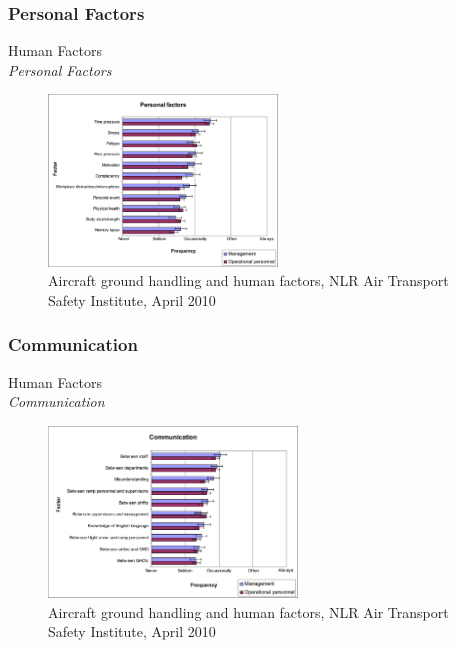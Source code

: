 \subsubsection{Personal Factors}
\begin{frame}{Human Factors\\\small\textit{Personal Factors}}{}
	\begin{figure}[H]
	\centering
	\includegraphics[width=230px]{Grafik/PersonalFactors}
	\caption{\footnotesize Aircraft ground handling and human factors, NLR Air Transport Safety Institute, April 2010}
\end{figure}
\end{frame}

\subsubsection{Communication}
\begin{frame}{Human Factors\\\small\textit{Communication}}{}
	\begin{figure}[H]
	\centering
	\includegraphics[width=250px]{Grafik/CommunicationalFactors}
	\caption{\footnotesize Aircraft ground handling and human factors, NLR Air Transport Safety Institute, April 2010}
\end{figure}
\end{frame}

